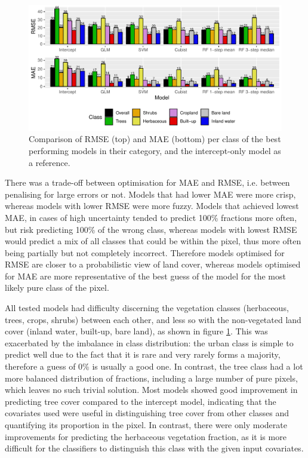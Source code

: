 \documentclass[review,authoryear,3p]{elsarticle}
\begin{document}
\begin{figure}
    \includegraphics[width=\textwidth]{article/article-figures/barplots/2020-06-03-model-comparison-bar}
    \caption{Comparison of \gls{RMSE} (top) and \gls{MAE} (bottom) per class of the best performing models in their category, and the intercept-only model as a reference.}
    \label{fig-models}
\end{figure}

There was a trade-off between optimisation for \gls{MAE} and \gls{RMSE}, i.e. between penalising for large errors or not.
Models that had lower \gls{MAE} were more crisp, whereas models with lower \gls{RMSE} were more fuzzy.
Models that achieved lowest \gls{MAE}, in cases of high uncertainty tended to predict 100\% fractions more often, but risk predicting 100\% of the wrong class, whereas models with lowest \gls{RMSE} would predict a mix of all classes that could be within the pixel, thus more often being partially but not completely incorrect.
Therefore models optimised for \gls{RMSE} are closer to a probabilistic view of land cover, whereas models optimised for \gls{MAE} are more representative of the best guess of the model for the most likely pure class of the pixel.

All tested models had difficulty discerning the vegetation classes (herbaceous, trees, crops, shrubs) between each other, and less so with the non-vegetated land cover (inland water, built-up, bare land), as shown in figure \ref{fig-models}.
This was exacerbated by the imbalance in class distribution: the urban class is simple to predict well due to the fact that it is rare and very rarely forms a majority, therefore a guess of 0\% is usually a good one.
In contrast, the tree class had a lot more balanced distribution of fractions, including a large number of pure pixels, which leaves no such trivial solution.
Most models showed good improvement in predicting tree cover compared to the intercept model, indicating that the covariates used were useful in distinguishing tree cover from other classes and quantifying its proportion in the pixel.
In contrast, there were only moderate improvements for predicting the herbaceous vegetation fraction, as it is more difficult for the classifiers to distinguish this class with the given input covariates.
\end{document}
